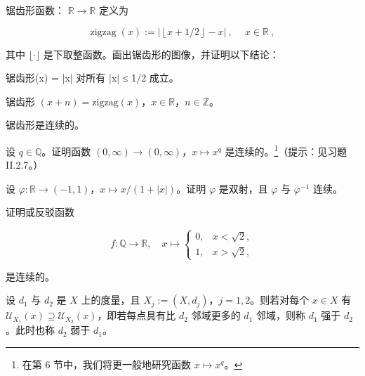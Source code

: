 \begin{exercises}
\item

锯齿形函数： $ \mathbb{R} \to \mathbb{R} $ 定义为

\[
\operatorname{z i g z a g}(x):=\left|\left\lfloor x+1/2\right\rfloor-x\right|\mathrm{~,~}\quad x\in\mathbb{R}\mathrm{~,~}
\]

其中 $ \lfloor\cdot\rfloor $ 是下取整函数。画出锯齿形的图像，并证明以下结论：

\begin{items}
\item

锯齿形(x) = |x| 对所有 |x| ≤ 1/2 成立。

\item

锯齿形 $ (x + n) = \text{zigzag}(x) $，$ x \in \mathbb{R} $，$ n \in \mathbb{Z} $。

\item

锯齿形是连续的。

\end{items}

\item

设 $ q \in \mathbb{Q} $。证明函数 $ (0, \infty) \to (0, \infty) $，$ x \mapsto x^q $ 是连续的。\footnote{在第 6 节中，我们将更一般地研究函数 $ x \mapsto x^q $。}（提示：见习题 II.2.7。）

\item

设 $ \varphi: \mathbb{R} \to (-1,1) $，$ x \mapsto x/(1+|x|) $。证明 $ \varphi $ 是双射，且 $ \varphi $ 与 $ \varphi^{-1} $ 连续。

\item

证明或反驳函数

\begin{equation*}
f:\mathbb{Q}\to\mathbb{R},\quad x\mapsto\left\{\begin{array}{ll}0,&x<\sqrt{2},\\1,&x>\sqrt{2},\end{array}\right.
\end{equation*}

是连续的。

\item

设 $d_1$ 与 $d_2$ 是 $X$ 上的度量，且 $X_j := (X, d_j)$，$j = 1, 2$。则若对每个 $x \in X$ 有 $\mathcal{U}_{X_1}(x) \supseteq \mathcal{U}_{X_2}(x)$，即若每点具有比 $d_2$ 邻域更多的 $d_1$ 邻域，则称 $d_1$ 强于 $d_2$。此时也称 $d_2$ 弱于 $d_1$。


\end{exercises}
